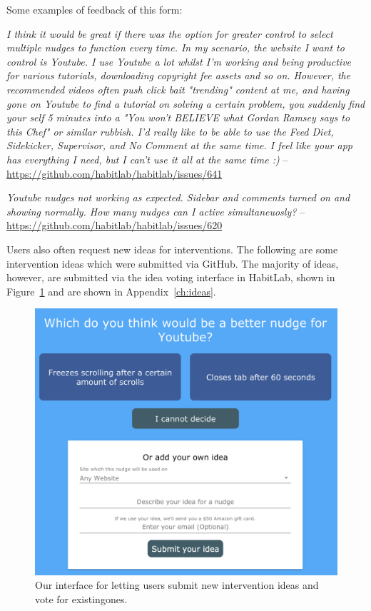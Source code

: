 Some examples of feedback of this form:

\textit{I think it would be great if there was the option for greater control to select multiple nudges to function every time. In my scenario, the website I want to control is Youtube. I use Youtube a lot whilst I'm working and being productive for various tutorials, downloading copyright fee assets and so on. However, the recommended videos often push click bait "trending" content at me, and having gone on Youtube to find a tutorial on solving a certain problem, you suddenly find your self 5 minutes into a "You won't BELIEVE what Gordan Ramsey says to this Chef" or similar rubbish. I'd really like to be able to use the Feed Diet, Sidekicker, Supervisor, and No Comment at the same time. I feel like your app has everything I need, but I can't use it all at the same time :)} -- \url{https://github.com/habitlab/habitlab/issues/641}

\textit{Youtube nudges not working as expected. Sidebar and comments turned on and showing normally. How many nudges can I active simultaneuosly?} -- \url{https://github.com/habitlab/habitlab/issues/620}

Users also often request new ideas for interventions. The following are some intervention ideas which were submitted via GitHub. The majority of ideas, however, are submitted via the idea voting interface in HabitLab, shown in Figure~\ref{fig:idea_voting} and are shown in Appendix~\ref{ch:ideas}.

\begin{figure}
\includegraphics[width=\linewidth]{figuresS/idea_voting}
\caption{Our interface for letting users submit new intervention ideas and vote for existingones.}
  \label{fig:idea_voting}
\end{figure}

